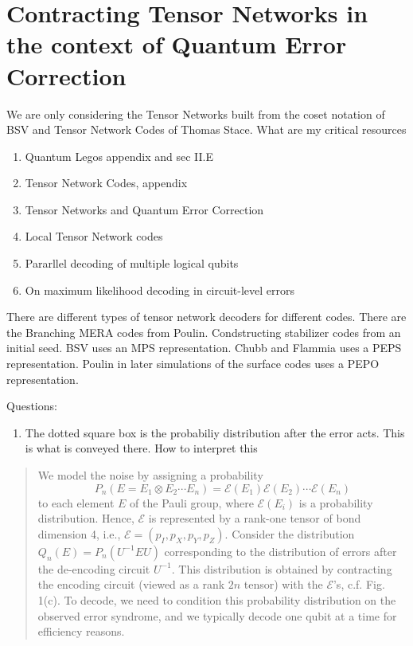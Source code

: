 \chapter{Contracting Tensor Networks in the context of Quantum Error Correction}

We are only considering the Tensor Networks built from the coset notation of BSV and Tensor Network Codes of Thomas Stace. What are my critical resources
\begin{enumerate}
    \item Quantum Legos appendix and sec II.E
    \item Tensor Network Codes, appendix
    \item Tensor Networks and Quantum Error Correction
    \item Local Tensor Network codes
    \item Pararllel decoding of multiple logical qubits
    \item On maximum likelihood decoding in circuit-level errors
\end{enumerate}

There are different types of tensor network decoders for different codes. There are the Branching MERA codes from Poulin. Condstructing stabilizer codes from an initial seed. BSV uses an MPS representation. Chubb and Flammia uses a PEPS representation. Poulin in later simulations of the surface codes uses a PEPO representation. 

Questions:
\begin{enumerate}
    \item The dotted square box is the probabiliy distribution after the error acts. This is what is conveyed there. How to interpret this
\end{enumerate}

\begin{quote}
    We  model  the  noise  by  assigning  a  probability $$P_n (E = E_1 \otimes E_2 \dotsb E_n) = \mathcal{E}(E_1) \mathcal{E}(E_2) \dotsb \mathcal{E}(E_n)$$  to  each element $E$ of the Pauli group, where $\mathcal{E}(E_i)$ is a probability distribution. Hence, $\mathcal{E}$ is represented by a rank-one tensor of bond dimension 4, i.e., $\mathcal{E} = (p_I,p_X, p_Y, p_Z)$. Consider the  distribution $Q_n(E) = P_n(U^{-1}EU)$ corresponding  to  the distribution  of errors  after  the  de-encoding circuit $U^{−1}$. This distribution is obtained by contracting the encoding circuit (viewed as a rank $2n$ tensor) with the $\mathcal{E}$’s, c.f. Fig. 1(c). To decode, we need to condition this probability distribution on the observed error syndrome, and we typically decode one qubit at a time for efficiency reasons.
\end{quote}

